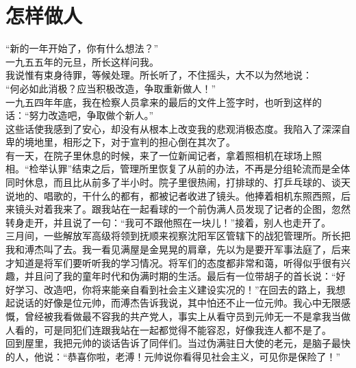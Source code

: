\fancyhead[RO]{} %
\fancyhead[LE]{} %
\chapter*{怎样做人}
\thispagestyle{empty}
“新的一年开始了，你有什么想法？”\\

一九五五年的元旦，所长这样问我。\\

我说惟有束身待罪，等候处理。所长听了，不住摇头，大不以为然地说：\\

“何必如此消极？应当积极改造，争取重新做人！”\\

一九五四年年底，我在检察人员拿来的最后的文件上签字时，也听到这样的话：“努力改造吧，争取做个新人。”\\

这些话使我感到了安心，却没有从根本上改变我的悲观消极态度。我陷入了深深自卑的境地里，相形之下，对于宣判的担心倒在其次了。\\

有一天，在院子里休息的时候，来了一位新闻记者，拿着照相机在球场上照相。“检举认罪”结束之后，管理所里恢复了从前的办法，不再是分组轮流而是全体同时休息，而且比从前多了半小时。院子里很热闹，打排球的、打乒乓球的、谈天说地的、唱歌的，干什么的都有，都被记者收进了镜头。他捧着相机东照西照，后来镜头对着我来了。跟我站在一起看球的一个前伪满人员发现了记者的企图，忽然转身走开，并且说了一句：“我可不跟他照在一块儿！”接着，别人也走开了。\\

三月间，一些解放军高级将领到抚顺来视察沈阳军区管辖下的战犯管理所。所长把我和溥杰叫了去。我一看见满屋是金晃晃的肩章，先以为是要开军事法庭了，后来才知道是将军们要听听我的学习情况。将军们的态度都非常和蔼，听得似乎很有兴趣，并且问了我的童年时代和伪满时期的生活。最后有一位带胡子的首长说：“好好学习、改造吧，你将来能亲自看到社会主义建设实况的！”在回去的路上，我想起说话的好像是位元帅，而溥杰告诉我说，其中怕还不止一位元帅。我心中无限感慨，曾经被我看做最不容我的共产党人，事实上从看守员到元帅无一不是拿我当做人看的，可是同犯们连跟我站在一起都觉得不能容忍，好像我连人都不是了。\\

回到屋里，我把元帅的谈话告诉了同伴们。当过伪满驻日大使的老元，是脑子最快的人，他说：“恭喜你啦，老溥！元帅说你看得见社会主义，可见你是保险了！”\\

